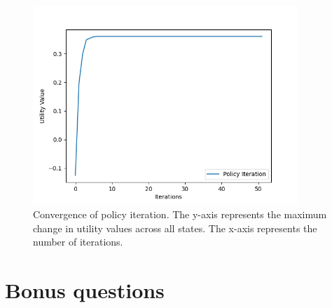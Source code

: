 \documentclass{article}
\begin{document}
\begin{figure}[H]
    \includegraphics[width=100mm]{../asset/policy_iteration_curve.png}
    \caption{Convergence of policy iteration. The y-axis represents the maximum change in utility values across all states. The x-axis represents the number of iterations.}
    \label{fig:policy_iteration_convergence}
\end{figure}

\section{Bonus questions}
\end{document}
